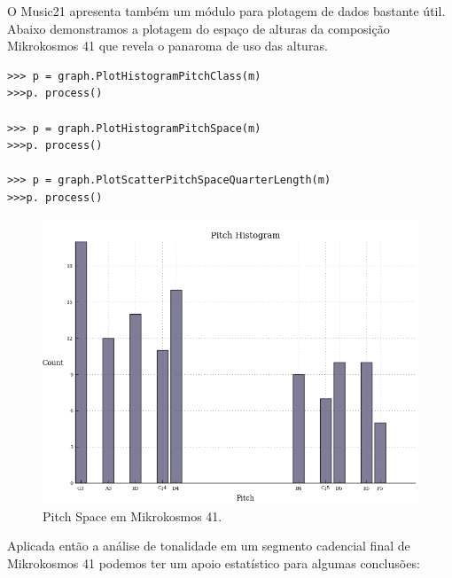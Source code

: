 \documentclass[
	12pt,				%
	openright,			%
	twoside,			%
	a4paper,			%
	english,			%
	french,				%
	spanish,			%
	brazil				%
	]{abntex2}
\begin{document}
O Music21 apresenta também um módulo para plotagem de dados bastante útil. Abaixo demonstramos a plotagem do espaço de alturas da composição Mikrokosmos 41 que revela o panaroma de uso das alturas.


\begin{lstlisting}
>>> p = graph.PlotHistogramPitchClass(m)
>>>p. process()

>>> p = graph.PlotHistogramPitchSpace(m)
>>>p. process()

>>> p = graph.PlotScatterPitchSpaceQuarterLength(m)
>>>p. process()

\end{lstlisting}


\begin{figure}[!h]
	\caption{\label{fig_grafico} Pitch Space em Mikrokosmos 41.} 
	\begin{center}
	    \includegraphics[scale=0.4]{estudosM21/mikro041Pspace.png}
	\end{center}
\end{figure}


Aplicada então a análise de tonalidade em um segmento cadencial final de Mikrokosmos 41 podemos ter um apoio estatístico para algumas conclusões:
\end{document}
